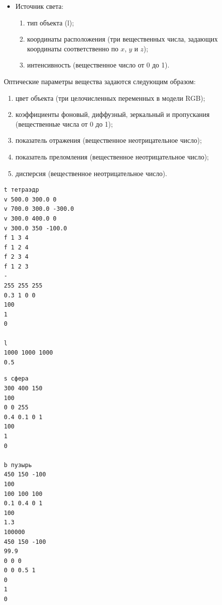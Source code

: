 \begin{itemize}
\clearpage

\item Источник света:
\begin{enumerate}[label=\arabic*)]
    \item тип объекта (l);
    \item координаты расположения (три вещественных числа, задающих координаты соответственно по $x$, $y$ и $z$);
    \item интенсивность (вещественное число от 0 до 1).
\end{enumerate}

\end{itemize}

Оптические параметры вещества задаются следующим образом:

\begin{enumerate}[label=\arabic*)]
    \item цвет объекта (три целочисленных переменных в модели RGB);
    \item коэффициенты фоновый, диффузный, зеркальный и пропускания (вещественные числа от 0 до 1);
    \item показатель отражения (вещественное неотрицательное число);
    \item показатель преломления (вещественное неотрицательное число);
    \item дисперсия (вещественное неотрицательное число).
\end{enumerate}

\begin{center}
\captionsetup{justification=raggedright,singlelinecheck=off}
\begin{lstlisting}[label=lst:ray_1,caption=Пример входного файла с триангулированным объектом и источником света,basicstyle=\ttfamily\footnotesize]
t тетраэдр
v 500.0 300.0 0
v 700.0 300.0 -300.0
v 300.0 400.0 0
v 300.0 350 -100.0
f 1 3 4
f 1 2 4
f 2 3 4
f 1 2 3
-
255 255 255
0.3 1 0 0
100
1
0

l
1000 1000 1000
0.5
\end{lstlisting}
\end{center}

\clearpage

\begin{center}
\captionsetup{justification=raggedright,singlelinecheck=off}
\begin{lstlisting}[label=lst:ray_1,caption=Пример входного файла со сферой и пузырём,basicstyle=\ttfamily\footnotesize]
s сфера
300 400 150
100
0 0 255
0.4 0.1 0 1
100
1
0

b пузырь
450 150 -100
100
100 100 100
0.1 0.4 0 1
100
1.3
100000
450 150 -100
99.9
0 0 0
0 0 0.5 1
0
1
0
\end{lstlisting}
\end{center}

